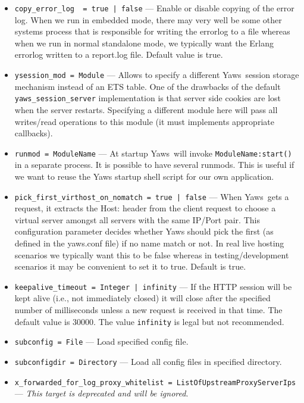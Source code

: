\documentclass[11pt,oneside,english]{book}
\newcommand{\Yaws}            %
        {{\sc Yaws}}
\begin{document}
\begin{itemize}
\item        \verb+copy_error_log  = true | false+ ---
              Enable or disable copying of the error log. When we run in
              embedded mode, there may very well be some other systems process
              that is responsible for writing the errorlog to a file whereas
              when we run in normal standalone mode, we typically want the
              Erlang errorlog written to a report.log file.  Default value is
              true.

\item        \verb+ysession_mod = Module+ ---
               Allows to specify a different \Yaws\ session storage mechanism
               instead of an ETS table. One of the drawbacks of the default
               \verb+yaws_session_server+ implementation is that server side
               cookies are lost when the server restarts. Specifying a different
               module here will pass all writes/read operations to this module
               (it must implements appropriate callbacks).

\item        \verb+runmod = ModuleName+ ---
               At startup \Yaws\ will invoke \verb+ModuleName:start()+ in a
               separate process. It is possible to have several runmods.  This
               is useful if we want to reuse the Yaws startup shell script for
               our own application.

\item        \verb+pick_first_virthost_on_nomatch = true | false+ ---
              When \Yaws\ gets a request, it extracts the Host: header from the
              client request to choose a virtual server amongst all servers with
              the same IP/Port pair.  This configuration parameter decides
              whether Yaws should pick the first (as defined in the yaws.conf
              file) if no name match or not.  In real live hosting scenarios we
              typically want this to be false whereas in testing/development
              scenarios it may be convenient to set it to true. Default is true.


\item        \verb+keepalive_timeout = Integer | infinity+ ---
              If the HTTP session will be kept alive (i.e., not
              immediately closed) it will close after the specified
              number of milliseconds unless a new request is received
              in that time. The default value is 30000. The value
              \verb+infinity+ is legal but not recommended.

\item        \verb+subconfig = File+ ---
              Load specified config file.

\item        \verb+subconfigdir = Directory+ ---
              Load all config files in specified directory.

\item        \verb+x_forwarded_for_log_proxy_whitelist = ListOfUpstreamProxyServerIps+ ---
              \textit{This target is deprecated and will be ignored}.

\end{itemize}
\end{document}
